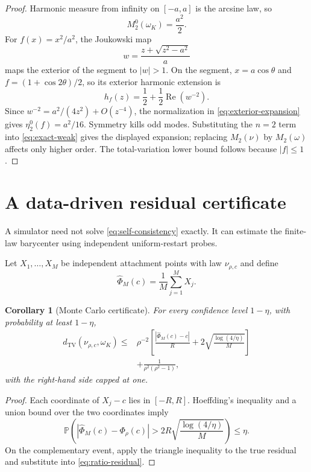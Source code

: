 \documentclass[11pt]{article}
\theoremstyle{mainthm}
\newtheorem{corollary}[corollary]{Corollary}
\theoremstyle{definition}
\theoremstyle{remark}
\newcommand{\Pp}{\mathbb P}
\newcommand{\dTV}{d_{\mathrm{TV}}}
\newcommand{\Real}{\operatorname{Re}}
\begin{document}
\begin{proof}
Harmonic measure from infinity on $[-a,a]$ is the arcsine law, so
\[
  M_2^0(\omega_K)=\frac{a^2}{2}.
\]
For $f(x)=x^2/a^2$, the Joukowski map
\[
  w=\frac{z+\sqrt{z^2-a^2}}{a}
\]
maps the exterior of the segment to $|w|>1$. On the segment, $x=a\cos\theta$ and $f=(1+\cos2\theta)/2$, so its exterior harmonic extension is
\[
  h_f(z)=\frac12+\frac12\Real(w^{-2}).
\]
Since $w^{-2}=a^2/(4z^2)+O(z^{-4})$, the normalization in \eqref{eq:exterior-expansion} gives $\eta_2^0(f)=a^2/16$. Symmetry kills odd modes. Substituting the $n=2$ term into \eqref{eq:exact-weak} gives the displayed expansion; replacing $M_2(\nu)$ by $M_2(\omega)$ affects only higher order. The total-variation lower bound follows because $|f|\le1$.
\end{proof}

\section{A data-driven residual certificate}

A simulator need not solve \eqref{eq:self-consistency} exactly. It can estimate the finite-law barycenter using independent uniform-restart probes.

Let $X_1,\ldots,X_M$ be independent attachment points with law $\nu_{\rho,c}$ and define
\[
  \widehat\Phi_M(c)=\frac1M\sum_{j=1}^M X_j.
\]

\begin{corollary}[Monte Carlo certificate]
\label{cor:monte-carlo}
For every confidence level $1-\eta$, with probability at least $1-\eta$,
\begin{equation}
\boxed{
\begin{aligned}
  \dTV(\nu_{\rho,c},\omega_K)
  \le{}&
  \rho^{-2}
  \left[
    \frac{|\widehat\Phi_M(c)-c|}{R}
    +2\sqrt{\frac{\log(4/\eta)}{M}}
  \right]
  \\
  &+\frac{1}{\rho^2(\rho^2-1)},
\end{aligned}
}
\label{eq:mc-certificate}
\end{equation}
with the right-hand side capped at one.
\end{corollary}

\begin{proof}
Each coordinate of $X_j-c$ lies in $[-R,R]$. Hoeffding's inequality and a union bound over the two coordinates imply \cite{Hoeffding1963}
\[
  \Pp\left(
  |\widehat\Phi_M(c)-\Phi_\rho(c)|
  >2R\sqrt{\frac{\log(4/\eta)}{M}}
  \right)\le\eta.
\]
On the complementary event, apply the triangle inequality to the true residual and substitute into \eqref{eq:ratio-residual}.
\end{proof}
\end{document}
